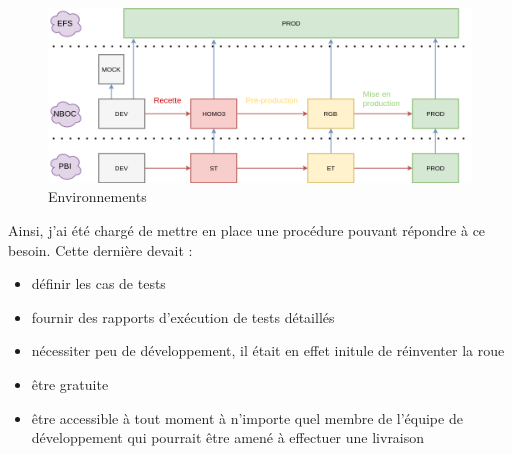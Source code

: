 \begin{figure}[h!]
	\includegraphics[scale=0.5]{images/travailNeuflizeOBC/testsFonc/environnement.png}
	\center
	\caption{Environnements}
	\label{environnement}
\end{figure}

	Ainsi, j'ai été chargé de mettre en place une procédure pouvant répondre à ce besoin. Cette dernière devait :	
	\begin{itemize}
		\item définir les cas de tests
		\item fournir des rapports d'exécution de tests détaillés
		\item nécessiter peu de développement, il était en effet initule de réinventer la roue
		\item être gratuite
		\item être accessible à tout moment à n'importe quel membre de l'équipe de développement qui pourrait être amené à effectuer une livraison \\
	\end{itemize}